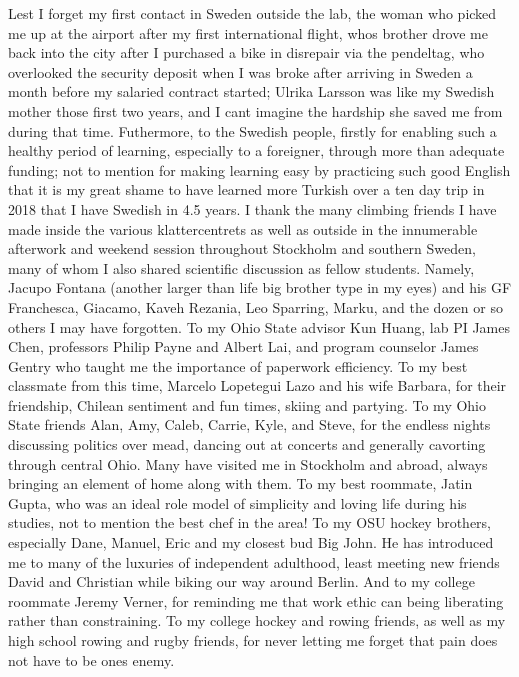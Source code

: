 Lest I forget my first contact in Sweden outside the lab, the woman who picked me up at the airport after my first international flight, whos brother drove me back into the city after I purchased a bike in disrepair via the pendeltag, who overlooked the security deposit when I was broke after arriving in Sweden a month before my salaried contract started; Ulrika Larsson was like my Swedish mother those first two years, and I cant imagine the hardship she saved me from during that time. Futhermore, to the Swedish people, firstly for enabling such a healthy period of learning, especially to a foreigner, through more than adequate funding; not to mention for making learning easy by practicing such good English that it is my great shame to have learned more Turkish over a ten day trip in 2018 that I have Swedish in 4.5 years.
I thank the many climbing friends I have made inside the various klattercentrets as well as outside in the innumerable afterwork and weekend session throughout Stockholm and southern Sweden, many of whom I also shared scientific discussion as fellow students. Namely, Jacupo Fontana (another larger than life big brother type in my eyes) and his GF Franchesca, Giacamo, Kaveh Rezania, Leo Sparring, Marku, and the dozen or so others I may have forgotten.
To my Ohio State advisor Kun Huang, lab PI James Chen, professors Philip Payne and Albert Lai, and program counselor James Gentry who taught me the importance of paperwork efficiency. To my best classmate from this time, Marcelo Lopetegui Lazo and his wife Barbara, for their friendship, Chilean sentiment and fun times, skiing and partying. To my Ohio State friends Alan, Amy, Caleb, Carrie, Kyle, and Steve, for the endless nights discussing politics over mead, dancing out at concerts and generally cavorting through central Ohio. Many have visited me in Stockholm and abroad, always bringing an element of home along with them. To my best roommate, Jatin Gupta, who was an ideal role model of simplicity and loving life during his studies, not to mention the best chef in the area! To my OSU hockey brothers, especially Dane, Manuel, Eric and my closest bud Big John. He has introduced me to many of the luxuries of independent adulthood, least meeting new friends David and Christian while biking our way around Berlin. And to my college roommate Jeremy Verner, for reminding me that work ethic can being liberating rather than constraining. To my college hockey and rowing friends, as well as my high school rowing and rugby friends, for never letting me forget that pain does not have to be ones enemy.
